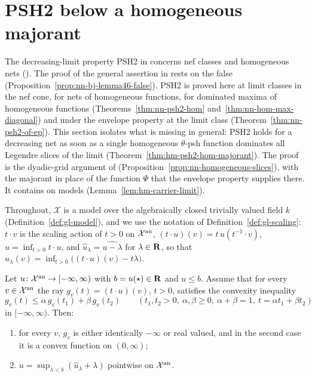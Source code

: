 \section{PSH2 below a homogeneous majorant}\label{sec:psh2-hom-majorant}

The decreasing-limit property PSH2 in \cite[Proposition~2.1(1)]{FHX} concerns nef classes
and homogeneous nets (\cite[Remark~2.2]{FHX}). The proof of the general assertion in
\cite[Theorem~4.5]{BJ22} rests on the false \cite[Lemma~4.6]{BJ22}
(Proposition~\ref{prop:nn-bj-lemma46-false}). PSH2 is proved here at limit classes in the nef cone, for nets
of homogeneous functions, for dominated maxima of homogeneous functions (Theorems~\ref{thm:nn-psh2-hom} and~\ref{thm:nn-hom-max-diagonal}) and under the
envelope property at the limit class (Theorem~\ref{thm:nn-psh2-of-ep}). This section isolates what is missing in general: PSH2 holds for a decreasing net as
soon as a single homogeneous $\theta$-psh function dominates all Legendre slices of the limit (Theorem~\ref{thm:hm-psh2-hom-majorant}). The proof is the
dyadic-grid argument of \cite[Proposition~7.5]{FHX} (Proposition~\ref{prop:nn-homogeneous-slices}), with the majorant in place of the function $\Psi$ that
the envelope property supplies there. It contains \cite[Lemma~7.4]{FHX} on models (Lemma~\ref{lem:hm-carrier-limit}).

Throughout, $\mathcal X$ is a model over the algebraically closed trivially valued field $k$ (Definition~\ref{def:gl-model}), and we use the notation of
Definition~\ref{def:gl-scaling}: $t\cdot v$ is the scaling action of $t>0$ on $\mathcal X^{\mathrm{an}}$, $(t\cdot u)(v)=t\,u(t^{-1}\cdot v)$, $\hat u=\inf_{t>0}t\cdot u$, and
$\hat u_\lambda=\widehat{u-\lambda}$ for $\lambda\in\mathbf{R}$, so that $\hat u_\lambda(v)=\inf_{t>0}\bigl((t\cdot u)(v)-t\lambda\bigr)$.

\begin{lemma}\label{lem:hm-convex-ray-reconstruction}
\leanok
{}
Let $u\colon\mathcal X^{\mathrm{an}}\to[-\infty,\infty)$ with $b=u(\star)\in\mathbf{R}$ and $u\le b$. Assume that for every $v\in\mathcal X^{\mathrm{an}}$ the ray $g_v(t)=(t\cdot u)(v)$,
$t>0$, satisfies the convexity inequality
\[
g_v(t)\le\alpha\,g_v(t_1)+\beta\,g_v(t_2)\qquad(t_1,t_2>0,\ \alpha,\beta\ge0,\ \alpha+\beta=1,\ t=\alpha t_1+\beta t_2)
\]
in $[-\infty,\infty)$. Then:
\begin{enumerate}
\item for every $v$, $g_v$ is either identically $-\infty$ or real valued, and in the second case it is a convex function on $(0,\infty)$;
\item $u=\sup_{\lambda<b}(\hat u_\lambda+\lambda)$ pointwise on $\mathcal X^{\mathrm{an}}$.
\end{enumerate}
\end{lemma}

